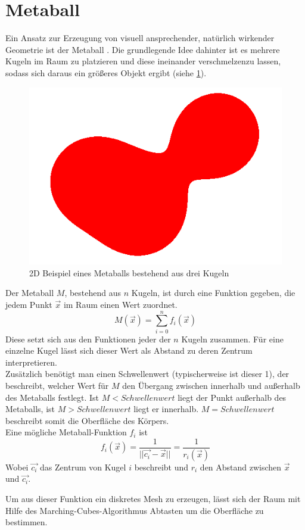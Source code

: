 \section{Metaball} \label{sec:metaball}
Ein Ansatz zur Erzeugung von visuell ansprechender, natürlich wirkender Geometrie ist der Metaball \cite{metaballArticle}.
Die grundlegende Idee dahinter ist es mehrere Kugeln im Raum zu platzieren und diese ineinander \glqq verschmelzen\grqq  zu lassen, sodass sich daraus ein größeres Objekt ergibt (siehe \ref{fig:2dMetaball}).

\begin{figure}[ht]
    \centering
    \includegraphics[width=0.5\linewidth]{chapters/02_Grundlagen/Metaball/metaball_2d}
    \caption{2D Beispiel eines Metaballs bestehend aus drei Kugeln}\label{fig:2dMetaball}
\end{figure}

Der Metaball $M$, bestehend aus $n$ Kugeln, ist durch eine Funktion gegeben, die jedem Punkt $\vec{x}$ im Raum einen Wert zuordnet.
\[M(\vec{x})=\sum_{i=0}^{n}f_i(\vec{x})\]
Diese setzt sich aus den Funktionen jeder der $n$ Kugeln zusammen. Für eine einzelne Kugel lässt sich dieser Wert als Abstand zu deren Zentrum interpretieren. \\
Zusätzlich benötigt man einen Schwellenwert (typischerweise ist dieser 1), der beschreibt, welcher Wert für $M$ den Übergang zwischen innerhalb und außerhalb des Metaballs festlegt.
Ist $M<Schwellenwert$ liegt der Punkt außerhalb des Metaballs, ist $M>Schwellenwert$ liegt er innerhalb. $M=Schwellenwert$ beschreibt somit die Oberfläche des Körpers.\\

Eine mögliche Metaball-Funktion $f_i$ ist
\[f_i(\vec{x}) = \frac{1}{||\vec{c_i}-\vec{x}||} = \frac{1}{r_i(\vec{x})}\]
Wobei $\vec{c_i}$ das Zentrum von Kugel $i$ beschreibt und $r_i$ den Abstand zwischen $\vec{x}$ und $\vec{c_i}$.

Um aus dieser Funktion ein diskretes Mesh zu erzeugen, lässt sich der Raum mit Hilfe des Marching-Cubes-Algorithmus Abtasten \cite{marching_cubes} um die Oberfläche zu bestimmen.